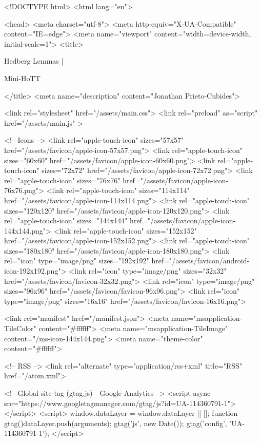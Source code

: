 <!DOCTYPE html>
<html lang="en">

<head>
  <meta charset="utf-8">
  <meta http-equiv="X-UA-Compatible" content="IE=edge">
  <meta name="viewport" content="width=device-width, initial-scale=1">
  <title>
    
      
        Hedberg Lemmas |
      
        Mini-HoTT
    
  </title>
  <meta name="description" content="Jonathan Prieto-Cubides">

  <link rel="stylesheet" href="/assets/main.css">
  <link rel="preload" as="script" href="/assets/main.js" >

  <!-- Icons -->
  <link rel="apple-touch-icon" sizes="57x57" href="/assets/favicon/apple-icon-57x57.png">
  <link rel="apple-touch-icon" sizes="60x60" href="/assets/favicon/apple-icon-60x60.png">
  <link rel="apple-touch-icon" sizes="72x72" href="/assets/favicon/apple-icon-72x72.png">
  <link rel="apple-touch-icon" sizes="76x76" href="/assets/favicon/apple-icon-76x76.png">
  <link rel="apple-touch-icon" sizes="114x114" href="/assets/favicon/apple-icon-114x114.png">
  <link rel="apple-touch-icon" sizes="120x120" href="/assets/favicon/apple-icon-120x120.png">
  <link rel="apple-touch-icon" sizes="144x144" href="/assets/favicon/apple-icon-144x144.png">
  <link rel="apple-touch-icon" sizes="152x152" href="/assets/favicon/apple-icon-152x152.png">
  <link rel="apple-touch-icon" sizes="180x180" href="/assets/favicon/apple-icon-180x180.png">
  <link rel="icon" type="image/png" sizes="192x192"  href="/assets/favicon/android-icon-192x192.png">
  <link rel="icon" type="image/png" sizes="32x32" href="/assets/favicon/favicon-32x32.png">
  <link rel="icon" type="image/png" sizes="96x96" href="/assets/favicon/favicon-96x96.png">
  <link rel="icon" type="image/png" sizes="16x16" href="/assets/favicon/favicon-16x16.png">

  <link rel="manifest" href="/manifest.json">
  <meta name="msapplication-TileColor" content="#ffffff">
  <meta name="msapplication-TileImage" content="/ms-icon-144x144.png">
  <meta name="theme-color" content="#ffffff">

  <!-- RSS -->
  <link rel="alternate" type="application/rss+xml" title="RSS" href="/atom.xml">

  <!-- Global site tag (gtag.js) - Google Analytics -->
  <script async src="https://www.googletagmanager.com/gtag/js?id=UA-114360791-1"></script>
  <script>
    window.dataLayer = window.dataLayer || [];
    function gtag(){dataLayer.push(arguments);}
    gtag('js', new Date());
    gtag('config', 'UA-114360791-1');
  </script>

